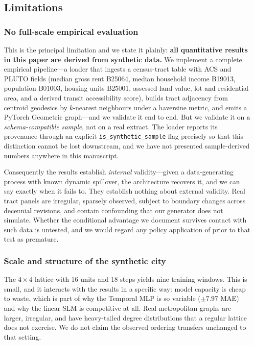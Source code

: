 \subsection{Limitations}

\subsubsection{No full-scale empirical evaluation}

This is the principal limitation and we state it plainly: \textbf{all
quantitative results in this paper are derived from synthetic data.} We
implement a complete empirical pipeline---a loader that ingests a census-tract
table with ACS and PLUTO fields (median gross rent B25064, median household
income B19013, population B01003, housing units B25001, assessed land value,
lot and residential area, and a derived transit accessibility score), builds
tract adjacency from centroid geodesics by $k$-nearest neighbours under a
haversine metric, and emits a PyTorch Geometric graph---and we validate it end
to end. But we validate it on a \emph{schema-compatible sample}, not on a real
extract. The loader reports its provenance through an explicit
\texttt{is\_synthetic\_sample} flag precisely so that this distinction cannot
be lost downstream, and we have not presented sample-derived numbers anywhere
in this manuscript.

Consequently the results establish \emph{internal} validity---given a
data-generating process with known dynamic spillover, the architecture recovers
it, and we can say exactly when it fails to. They establish nothing about
external validity. Real tract panels are irregular, sparsely observed, subject
to boundary changes across decennial revisions, and contain confounding that
our generator does not simulate. Whether the conditional advantage we document
survives contact with such data is untested, and we would regard any policy
application of \CGCEN{} prior to that test as premature.

\subsubsection{Scale and structure of the synthetic city}

The $4 \times 4$ lattice with $16$ units and $18$ steps yields nine training
windows. This is small, and it interacts with the results in a specific way:
model capacity is cheap to waste, which is part of why the Temporal MLP is so
variable ($\pm 7.97$ MAE) and why the linear SLM is competitive at all.
Real metropolitan graphs are larger, irregular, and have heavy-tailed degree
distributions that a regular lattice does not exercise. We do not claim the
observed ordering transfers unchanged to that setting.

